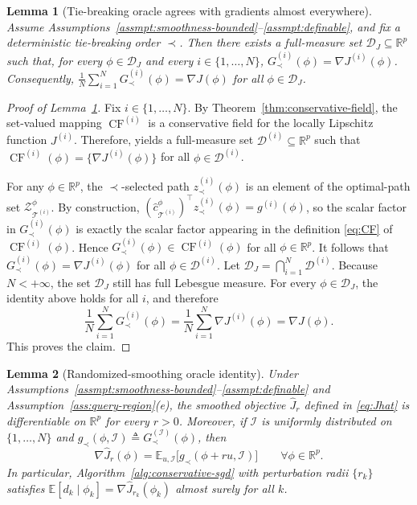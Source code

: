 \documentclass[11pt, letterpaper, oneside, reqno]{amsart}
\newcommand{\R}{\mathbb{R}}
\newcommand{\Let}{\triangleq}
\newtheorem{lemma}{Lemma}
\begin{document}
\begin{lemma}[Tie-breaking oracle agrees with gradients almost everywhere]
\label{lem:oracle-ae}
Assume Assumptions~\ref{assmpt:smoothness-bounded}--\ref{assmpt:definable}, and fix a deterministic tie-breaking order $\prec$.
Then there exists a full-measure set $\mathcal D_J\subseteq\R^p$ such that, for every $\phi\in\mathcal D_J$ and every $i\in\{1,\dots,N\}$,
$G^{(i)}_{\prec}(\phi)=\nabla J^{(i)}(\phi)$.
Consequently,
$\frac1N\sum_{i=1}^N G^{(i)}_{\prec}(\phi)=\nabla J(\phi)$ for all $\phi\in\mathcal D_J$.
\end{lemma}

\begin{proof}[Proof of Lemma~\ref{lem:oracle-ae}]
Fix $i\in\{1,\dots,N\}$. By Theorem~\ref{thm:conservative-field}, the set-valued mapping $\operatorname{CF}^{(i)}$ is a conservative field for the locally Lipschitz function $J^{(i)}$. Therefore, \cite[Theorem~1]{ref:bolte2021conservative} yields a full-measure set $\mathcal D^{(i)}\subseteq\R^p$ such that $\operatorname{CF}^{(i)}(\phi)=\{\nabla J^{(i)}(\phi)\}$ for all $\phi\in\mathcal D^{(i)}$.

For any $\phi\in\R^p$, the $\prec$-selected path $z^{(i)}_{\prec}(\phi)$ is an element of the optimal-path set $\mathcal Z_{\mathcal T^{(i)}}^\phi$.
By construction, 
$(\hat c_{\mathcal T^{(i)}}^\phi)^\top z^{(i)}_{\prec}(\phi)=g^{(i)}(\phi)$,
so the scalar factor in $G^{(i)}_{\prec}(\phi)$ is exactly the scalar factor appearing in the definition \eqref{eq:CF} of $\operatorname{CF}^{(i)}(\phi)$.
Hence
$G^{(i)}_{\prec}(\phi)\in \operatorname{CF}^{(i)}(\phi)$ for all $\phi\in\R^p$.
It follows that
$G^{(i)}_{\prec}(\phi)=\nabla J^{(i)}(\phi)$ for all $\phi\in\mathcal D^{(i)}$.
Let $\mathcal D_J = \bigcap_{i=1}^N \mathcal D^{(i)}$.
Because $N<+\infty$, the set $\mathcal D_J$ still has full Lebesgue measure.
For every $\phi\in\mathcal D_J$, the identity above holds for all $i$, and therefore
\[
\frac1N\sum_{i=1}^N G^{(i)}_{\prec}(\phi)
= \frac1N\sum_{i=1}^N \nabla J^{(i)}(\phi)
= \nabla J(\phi).
\]
This proves the claim.
\end{proof}


\begin{lemma}[Randomized-smoothing oracle identity]
\label{lem:smoothing-oracle}
Under Assumptions~\ref{assmpt:smoothness-bounded}--\ref{assmpt:definable} and Assumption~\ref{ass:query-region}(e), the smoothed objective $\hat J_r$ defined in \eqref{eq:Jhat} is differentiable on $\R^p$ for every $r>0$.
Moreover, if $\mathcal I$ is uniformly distributed on $\{1,\dots,N\}$ and $g_\prec(\phi, \mathcal I)\Let G^{(\mathcal I)}_{\prec}(\phi)$,
then
\[
\nabla \hat J_r(\phi)
= \mathbb E_{u, \mathcal I}\big[g_\prec(\phi+r u, \mathcal I)\big]
\qquad\forall \phi\in\R^p.
\]
In particular, Algorithm~\ref{alg:conservative-sgd} with perturbation radii $\{r_k\}$ satisfies $\mathbb E[d_k\mid \phi_k]=\nabla \hat J_{r_k}(\phi_k)$ almost surely for all $k$.
\end{lemma}
\end{document}
